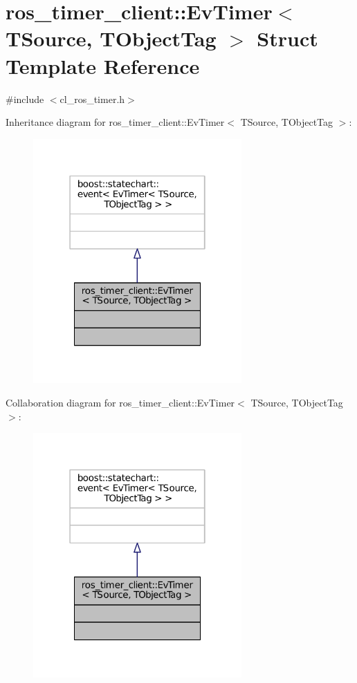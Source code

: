 \hypertarget{structros__timer__client_1_1EvTimer}{}\section{ros\+\_\+timer\+\_\+client\+:\+:Ev\+Timer$<$ T\+Source, T\+Object\+Tag $>$ Struct Template Reference}
\label{structros__timer__client_1_1EvTimer}


{\ttfamily \#include $<$cl\+\_\+ros\+\_\+timer.\+h$>$}



Inheritance diagram for ros\+\_\+timer\+\_\+client\+:\+:Ev\+Timer$<$ T\+Source, T\+Object\+Tag $>$\+:
\nopagebreak
\begin{figure}[H]
\begin{center}
\leavevmode
\includegraphics[width=226pt]{structros__timer__client_1_1EvTimer__inherit__graph}
\end{center}
\end{figure}


Collaboration diagram for ros\+\_\+timer\+\_\+client\+:\+:Ev\+Timer$<$ T\+Source, T\+Object\+Tag $>$\+:
\nopagebreak
\begin{figure}[H]
\begin{center}
\leavevmode
\includegraphics[width=226pt]{structros__timer__client_1_1EvTimer__coll__graph}
\end{center}
\end{figure}


